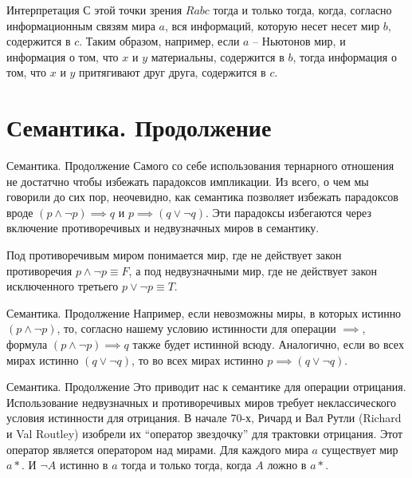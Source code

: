 \documentclass[14pt]{beamer}
\begin{document}
\begin{frame}[nologo]{Интерпретация}
С этой точки зрения $ Rabc $ тогда и только тогда, когда, согласно 
информационным связям мира $ a $, вся информаций, которую несет несет мир $ b 
$, содержится в $ c $. Таким образом, например, если $ a $ -- Ньютонов мир, и 
информация о том, что $ x $ и $ y $ материальны, содержится в $ 
b $, тогда информация о том, что $ x $ и $ y $ притягивают друг друга, 
содержится в $ c $.
\end{frame}

\section{Семантика. Продолжение}

\begin{frame}[nologo]{Семантика. Продолжение}
Самого со себе использования тернарного отношения не достатчно чтобы избежать 
парадоксов импликации. Из всего, о чем мы говорили до сих пор, неочевидно, как 
семантика позволяет избежать парадоксов вроде $ (p \wedge \neg p) \implies q $ 
и $ p \implies (q \vee \neg q) $. Эти парадоксы избегаются через включение 
противоречивых и недвузначных миров в семантику.

Под противоречивым миром понимается мир, где не действует закон противоречия $ 
p \wedge \neg p \equiv F $, а под недвузначными мир, где не действует 
закон исключенного третьего $ p \vee \neg p \equiv T $.
\end{frame}

\begin{frame}[nologo]{Семантика. Продолжение}
Например, если невозможны миры, в которых истинно $ (p \wedge \neg p) $, то, 
согласно нашему условию истинности для операции $\implies$, формула $(p 
\wedge \neg p) \implies q$ также будет истинной всюду. Аналогично, если во всех 
мирах истинно $(q \vee \neg q)$, то во всех мирах истинно $ p \implies (q \vee 
\neg q)$.
\end{frame}

\begin{frame}[nologo]{Семантика. Продолжение}
Это приводит нас к семантике для операции отрицания. Использование недвузначных 
и противоречивых миров требует неклассического условия истинности для 
отрицания. В начале 70-х, Ричард и Вал Рутли (Richard и Val Routley) изобрели 
их ``оператор звездочку'' для трактовки отрицания. Этот оператор является 
оператором над мирами. Для каждого мира $a$ существует мир $a*$. И $\neg A$ 
истинно в $a$ тогда и только тогда, когда $A$ ложно в $a*$.
\end{frame}
\end{document}
